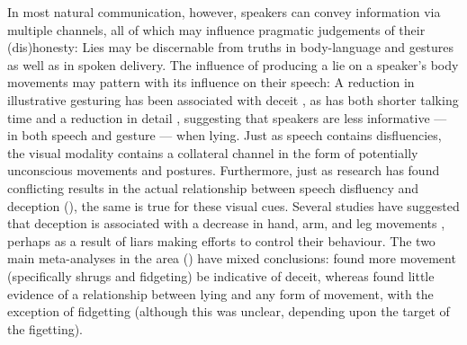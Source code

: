 \documentclass[a4paper,man,natbib]{apa6}
\begin{document}
In most natural communication, however, speakers can convey information via multiple channels, all of which may influence pragmatic judgements of their (dis)honesty: %
Lies may be discernable from truths in body-language and gestures as well as in spoken delivery.
The influence of producing a lie on a speaker's body movements may pattern with its influence on their speech: %
A reduction in illustrative gesturing has been associated with deceit \citep{DePaulo2003, Cohen2010}, as has both shorter talking time and a reduction in detail \citep{DePaulo2003}, suggesting that speakers are less informative --- in both speech and gesture --- when lying. 
Just as speech contains disfluencies, the visual modality contains a collateral channel in the form of potentially unconscious movements and postures.
Furthermore, just as research has found conflicting results in the actual relationship between speech disfluency and deception (\citealt{Zuckerman1981, DePaulo2003}), the same is true for these visual cues. %
Several studies have suggested that deception is associated with a decrease in hand, arm, and leg movements \citep{DePaulo1992, Ekman1989, Vrij1995}, perhaps as a result of liars making efforts to control their behaviour. %
The two main meta-analyses in the area (\citealt{Zuckerman1981, DePaulo2003}) have mixed conclusions: \citet{Zuckerman1981} found more movement (specifically shrugs and fidgeting) be indicative of deceit, whereas \citet{DePaulo2003} found little evidence of a relationship between lying and any form of movement, with the exception of fidgetting (although this was unclear, depending upon the target of the figetting).%
\end{document}

